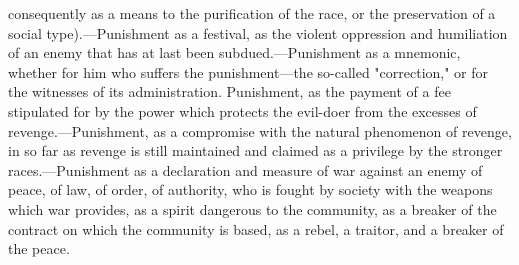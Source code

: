 \documentclass[12pt]{article}
\begin{document}
consequently as a means to the purification of the race, or the preservation of a social type).---Punishment as a festival, as the violent oppression and humiliation of an enemy that has at last been subdued.---Punishment as a mnemonic, whether for him who suffers the punishment---the so-called "correction," or for the witnesses of its administration. Punishment, as the payment of a fee stipulated for by the power which protects the evil-doer from the excesses of revenge.---Punishment, as a compromise with the natural phenomenon of revenge, in so far as revenge is still maintained and claimed as a privilege by the stronger races.---Punishment as a declaration and measure of war against an enemy of peace, of law, of order, of authority, who is fought by society with the weapons which war provides, as a spirit dangerous to the community, as a breaker of the contract on which the community is based, as a rebel, a traitor, and a breaker of the peace.
\end{document}
